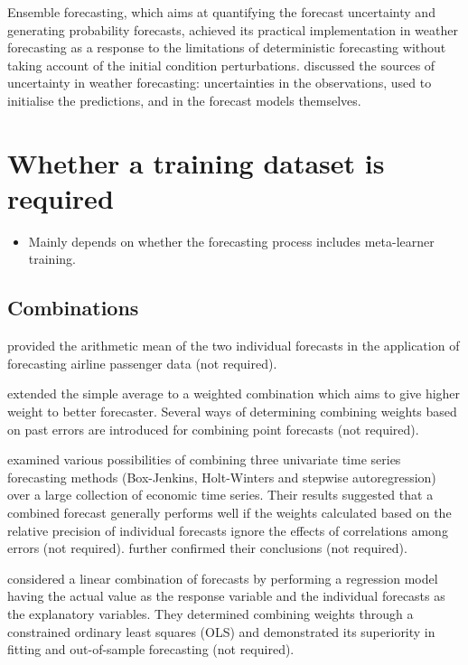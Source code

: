 \documentclass[11pt]{article}
\begin{document}
Ensemble forecasting, which aims at quantifying the forecast uncertainty and generating probability forecasts, achieved its practical implementation in weather forecasting as a response to the limitations of deterministic forecasting without taking account of the initial condition perturbations. \cite{Leutbecher2008-mc} discussed the sources of uncertainty in weather forecasting: uncertainties in the observations, used to initialise the predictions, and in the forecast models themselves.


\section{Whether a training dataset is required}
\begin{itemize}
\item Mainly depends on whether the forecasting process includes meta-learner training.
\end{itemize}

\subsection{Combinations}

\cite{Barnard1963-xa} provided the arithmetic mean of the two individual forecasts in the application of forecasting airline passenger data (not required).

\cite{Bates1969-yj} extended the simple average to a weighted combination which aims to give higher weight to better forecaster. Several ways of determining combining weights based on past errors are introduced for combining point forecasts (not required).

\cite{Newbold1974-lp} examined various possibilities of combining three univariate time series forecasting methods (Box-Jenkins, Holt-Winters and stepwise autoregression) over a large collection of economic time series. Their results suggested that a combined forecast generally performs well if the weights calculated based on the relative precision of individual forecasts ignore the effects of correlations among errors (not required). \cite{Winkler1983-ra} further confirmed their conclusions (not required).

\cite{Granger1984-na} considered a linear combination of forecasts by performing a regression model having the actual value as the response variable and the individual forecasts as the explanatory variables. They determined combining weights through a constrained ordinary least squares (OLS) and demonstrated its superiority in fitting and out-of-sample forecasting (not required).
\end{document}
